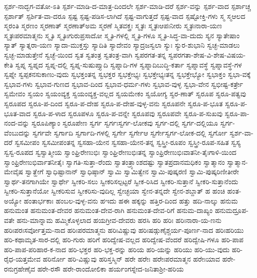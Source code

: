 {ಸ್ಪರ್ಶ-ನಾದ್ಭಗ-ವತೋ-ಽತಿ
ಸ್ಪರ್ಶ-ಮಾಡಿ-ದ-ಮಾತ್ರ-ದಿಂದಲೇ
ಸ್ಪರ್ಶ-ಮಾಡಿ-ದರೆ
ಸ್ಪರ್ಶ-ವನ್ನು
ಸ್ಪರ್ಶ-ವಾದ
ಸ್ಪರ್ಶಾಚ್ಚ
ಸ್ಪರ್ಶಾತ್
ಸ್ಪರ್ಶಿತ-ವಾ-ದರೂ
ಸ್ಪಷ್ಟ
ಸ್ಪಷ್ಟ-ಪಡಿಸ-ಲಾಗಿದೆ
ಸ್ಪಷ್ಟ-ವಾಗುತ್ತದೆ
ಸ್ಪಷ್ಟ-ವಾದ
ಸ್ಪಷ್ಟೋಕ್ತಿ-ಗಳು
ಸ್ಮ
ಸ್ಮಆಲದ
ಸ್ಮರಂತಿ
ಸ್ಮರಣಂ
ಸ್ಮರಣಾತ್
ಸ್ಮರಣಾತ್ಅಮ
ಸ್ಮರಣೆ
ಸ್ಮಿತವಕ್ತ್ರಃ
ಸ್ಮೃತಃ
ಸ್ಮೃತಃಆಪಃನೀರು
ಸ್ಮೃತಃನಾರಾ-ಯಣ
ಸ್ಮೃತಃಪರಮಾತ್ಮನು
ಸ್ಮೃತಿ
ಸ್ಮೃತಿಃಗುರುಪ್ರಸಾದೋ
ಸ್ಮೃತಿ-ಗಳಲ್ಲಿ
ಸ್ಮೃತಿ-ಗಳೂ
ಸ್ಮೃತಿ-ಸಿದ್ಧ-ವಾ-ದುದು
ಸ್ಯನ
ಸ್ಯಾತೇಷಾಂ
ಸ್ಯಾತ್
ಸ್ಯಾತ್ನರಾ-ಯಣ
ಸ್ಯಾದಾ-ಮುಕ್ತಸ್ತು
ಸ್ಯಾದಿತಿ
ಸ್ಯಾದೇವಂ
ಸ್ಯಾದ್ರಜಸ್ವಲಾ
ಸ್ಯುಃ
ಸ್ಯುರ-ಶುಭಾನಿ
ಸ್ವಚ್ಛ-ಮಾಡಲು
ಸ್ವಚ್ಛ-ಮಾಡುತ್ತೇನೆ
ಸ್ವಚ್ಛೆ-ಯಿಂದ
ಸ್ವತ
ಸ್ವತಂತ್ರ
ಸ್ವತಂತ್ರ-ವಾಗಿ
ಸ್ವಪರಗತ-ತನ್ನ
ಸ್ವಪರಗತಾ-ಶೇಷ-ವಿ-ಶೇಷ-ವಿಷಯ-ಕೇತಿ
ಸ್ವಪ್ನ
ಸ್ವಪ್ನದ
ಸ್ವಪ್ನ-ದಲ್ಲಿ
ಸ್ವಪ್ನ-ಸುಷುಪ್ತ್ಯಾದಿ
ಸ್ವಪ್ನಾದಿ-ಗಳ
ಸ್ವಪ್ನಾದಿಬುದ್ಧಿ-ಕರ್ತಾ
ಸ್ವಪ್ನಾವಸ್ಥೆ
ಸ್ವಪ್ನಾವಸ್ಥೆ-ಗಳ
ಸ್ವಪ್ನೇ
ಸ್ವಪ್ಪಕನಸುಕಾಣು-ವುದು
ಸ್ವಭಕ್ತಂತನ್ನ
ಸ್ವಭಕ್ತರ
ಸ್ವಭಕ್ತೇಭ್ಯಃ
ಸ್ವಭಕ್ತೇಭ್ಯಃತನ್ನ
ಸ್ವಭಕ್ತೇಭ್ಯೋ
ಸ್ವಭಾಕ್ತಂ
ಸ್ವಭಾ-ವಕ್ಕೆ
ಸ್ವಭಾವ-ಗಳು
ಸ್ವಭಾವ-ಗುಣದ
ಸ್ವಭಾವ-ದಿಂದ
ಸ್ವಭಾವ-ಧರ್ಮ-ಗಳು
ಸ್ವಭಾವ-ವುಳ್ಳ
ಸ್ವಭಾ-ವೇನ
ಸ್ವಭೀಷ್ಟ-ಕರ್ತ್ರೇ
ಸ್ವಮೇವಂ
ಸ್ವಯಂ
ಸ್ವಯಂವ್ಯಕ್ತ
ಸ್ವಯಂವ್ಯಕ್ತ-ವಲ್ಲದ
ಸ್ವಯಮೇಕಂ
ಸ್ವಯೋಗ್ಯ
ಸ್ವರ-ಣಾತ್
ಸ್ವರೂಪ
ಸ್ವರೂ-ಪತ್ವವು
ಸ್ವರೂಪದ
ಸ್ವರೂ-ಪ-ದಿಂದ
ಸ್ವರೂ-ಪ-ದೇಹ
ಸ್ವರೂ-ಪ-ದೇಹ-ವುಳ್ಳ-ವನು
ಸ್ವರೂಪನೇ
ಸ್ವರೂ-ಪ-ಭೂತ
ಸ್ವರೂ-ಪ-ಭೂತ-ವಾದ
ಸ್ವರೂ-ಪ-ಳಾದ
ಸ್ವರೂಪಳೂ
ಸ್ವರೂ-ಪ-ವನ್ನೇ
ಸ್ವರೂಪವು
ಸ್ವರೂಪವೇ
ಸ್ವರೂ-ಪ-ಸುಖವು
ಸ್ವರೂ-ಪಾ-ನಂದ-ವನ್ನು
ಸ್ವರೂಪಿಣ್ಯಾಂ
ಸ್ವರೂಪೇಣ
ಸ್ವರ್ಗ
ಸ್ವರ್ಗಃಸ್ವರ್ಗ-ಲೋಕವು
ಸ್ವರ್ಗ-ದಲ್ಲಿ
ಸ್ವರ್ಗ-ದಲ್ಲಿಯೂ
ಸ್ವರ್ಗ-ವೆಂಬುದನ್ನು
ಸ್ವರ್ಗವೇ
ಸ್ವರ್ಗಾದಿ
ಸ್ವರ್ಗಾದಿ-ಗಳಲ್ಲಿ
ಸ್ವರ್ಗೇ
ಸ್ವರ್ಗೇಆ
ಸ್ವರ್ಗೇಸ್ವರ್ಗ-ಲೋಕ-ದಲ್ಲಿ
ಸ್ವರ್ಗೋ
ಸ್ವರ್ಶ-ವಾ-ದರೆ
ಸ್ವಸಮೀಪಂ
ಸ್ವಸಮೀಪಂತನ್ನ
ಸ್ವಸಹಾ-ಯೇನ
ಸ್ವಸಹಾ-ಯೇನ-ತನ್ನ
ಸ್ವಸ್ತ್ರೀ-ರೂಪಂ
ಸ್ವಸ್ತ್ರೀ-ರೂಪ-ಸಹಿತ
ಸ್ವಸ್ಯ
ಸ್ವಸ್ವ-ರೂಪದ
ಸ್ವಸ್ವಾತ್ಮೀಯ
ಸ್ವಾಂಘ್ರಿರೇಣುಭಿಃ
ಸ್ವಾಂಘ್ರಿರೇಣುಭಿಃತನ್ನ
ಸ್ವಾಂಫ್ರಿರೇಣುಭಿಃವಾತನೀ-ತೈಃಗಾಳಿ-ಯಿಂದ
ಸ್ವಾಂಫ್ರಿರೇಣುಭಿರ್ವಾತನೀತೈಃ
ಸ್ವಾಗತಿ-ಸುತ್ತಾ-ರೆಂದು
ಸ್ವಾತಂತ್ರ್ಯಾಂಶದಷ್ಟು
ಸ್ವಾತಪ್ರದಾನಮಧಿಕಂ
ಸ್ವಾತ್ಮಾನಂ
ಸ್ವಾತ್ಮಾನ-ಮೇವೈಷ
ಸ್ವಾತ್ಹೇಗೆ
ಸ್ವಾಧಿಷ್ಟಾನಾನ್
ಸ್ವಾಧಿಷ್ಠಾನ್
ಸ್ವಾಮಿ
ಸ್ವಾಮಿತ್ವೇನ
ಸ್ವಾಮಿ-ಪುಷ್ಕರಣಿ
ಸ್ವಾಮಿ-ಪುಷ್ಕರಿಣೀತೀರೇ
ಸ್ವಾರ್ಥ-ತನಗಾಗಿಯೇ
ಸ್ವಾರ್ಥೇ
ಸ್ವೀಕರಿ-ಸಲು
ಸ್ವೀಕರಿಸಲ್ಪಟ್ಟರೆ
ಸ್ವೀಕ-ರಿಸಿದ
ಸ್ವೀಕರಿ-ಸುತ್ತಾನೆ
ಸ್ವೀಕರಿ-ಸುತ್ತಾನೆಂದು
ಸ್ವೀಕರಿ-ಸುತ್ತಾನೆಯೋ
ಸ್ವೀಕರಿಸುವ
ಸ್ವೀಕರಿಸು-ವುದಿಲ್ಲ
ಸ್ವೇಚ್ಛಯಾ
ಸ್ವೇನ-ತನ್ನದೇ
ಸ್ವೇನ-ಶಬ್ದಾತ್
ಹ
ಹಂಚಿ
ಹಂತ-ಅಯ್ಯೋ
ಹಂತಾರ್ಭಕಾಃ
ಹಂಬಲ-ವುಳ್ಳ-ವನು
ಹಇದು
ಹಈ
ಹಕ್ಕನ್ನು
ಹತ್ತಿರ-ದಿಂದ
ಹತ್ತು
ಹದಿ-ನಾಲ್ಕು
ಹನುಮ
ಹನುಮಂತ
ಹನುಮಂತ-ದೇವರ
ಹನುಮಂತ-ದೇವ-ರಾಗಿ
ಹನುಮಂತ-ದೇವ-ರಿಗೆ
ಹನುಮ-ದಾಖ್ಯಂ
ಹನುಮದ್ರೂಪ-ವತೇ
ಹನು-ಮಾನ್ನಾಮ
ಹಮ್ಮಿಕೊಳ್ಳಲಾದ
ಹಯಗ್ರೀವ-ದೇವರು
ಹರಸಿ
ಹರಿ
ಹರಿಃ
ಹರಿಃನಾರಾ-ಯ-ಣನು
ಹರಿಃಪರಃಸರ್ವೋತ್ತಮ-ನಾದ
ಹರಿಃಪರಮಾತ್ಮನು
ಹರಿಃವಿಷ್ಣುವು
ಹರಿಃಷಡ್ಗುಣೈಶ್ಚರ್ಯ-ಪೂರ್ಣ-ನಾದ
ಹರಿಃಹರಿಯು
ಹರಿ-ಕಥಾಮೃತ-ಸಾರ-ದಲ್ಲಿ
ಹರಿ-ಗುರು
ಹರಿಗೆ
ಹರಿದ್ವೇಷ-ವಲ್ಲದ
ಹರಿದ್ವೇಷ-ವೆಂದರೆ
ಹರಿದ್ವೇಷಿ-ಗಳೂ
ಹರಿ-ಪಾಪ
ಹರಿ-ಪಾಪ-ಪರಿಹಾರ-ಕ-ನಾದ
ಹರಿ-ಭಕ್ತರ
ಹರಿ-ಭಕ್ತ-ರನ್ನು
ಹರಿಯ
ಹರಿ-ಯನ್ನು
ಹರಿಯು
ಹರಿ-ಯು-ವುದು
ಹರಿ-ರೈಧ-ಯತ್ತಮೇವ
ಹರಿರ್ನೋ
ಹರಿ-ವಿಷ್ಣುವು
ಹರಿಸ್ತಸ್ಮಿನ್
ಹರೇ
ಹರೇಃ
ಹರೇಃಪರಮಾತ್ಮನ
ಹರೇಃಯಾವ
ಹರೇ-ರನುಗ್ರಹೇಣೈವ
ಹರೇ-ರಸೌ‌
ಹರೇ-ರಾಂದೋಲಿಕಾ
ಹರ್ಯಂಗಸ್ನೇದ-ಜನಿತಾಶ್ರೀ-ಹರಿಯ
}
